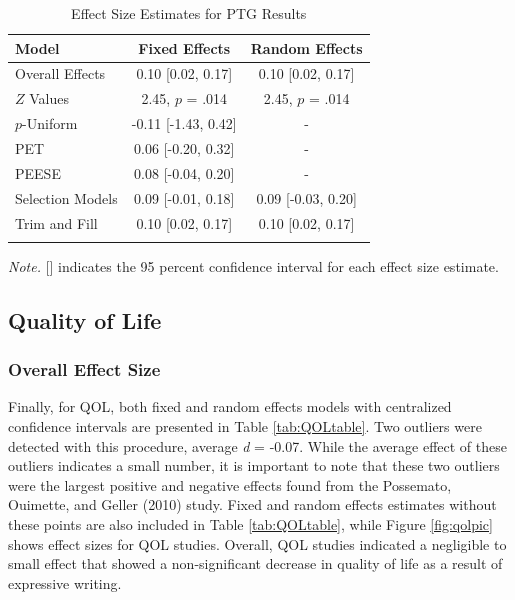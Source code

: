 \documentclass[,man]{apa6}
\begin{document}
\begin{table}[tbp]
\begin{center}
\begin{threeparttable}
\caption{\label{tab:PTGtable}Effect Size Estimates for PTG Results}
\small{
\begin{tabular}{lcc}
\toprule
Model & Fixed Effects & Random Effects\\
\midrule
Overall Effects & 0.10 [0.02, 0.17] & 0.10 [0.02, 0.17]\\
$Z$ Values & 2.45, $p$ = .014 & 2.45, $p$ = .014\\
$p$-Uniform & -0.11 [-1.43, 0.42] & -\\
PET & 0.06 [-0.20, 0.32] & -\\
PEESE & 0.08 [-0.04, 0.20] & -\\
Selection Models & 0.09 [-0.01, 0.18] & 0.09 [-0.03, 0.20]\\
Trim and Fill & 0.10 [0.02, 0.17] & 0.10 [0.02, 0.17]\\
\bottomrule
\addlinespace
\end{tabular}
}
\begin{tablenotes}[para]
\normalsize{\textit{Note.} [] indicates the 95 percent confidence interval for each effect size estimate.}
\end{tablenotes}
\end{threeparttable}
\end{center}
\end{table}

\hypertarget{quality-of-life-1}{%
\subsection{Quality of Life}\label{quality-of-life-1}}

\hypertarget{overall-effect-size-2}{%
\subsubsection{Overall Effect Size}\label{overall-effect-size-2}}

Finally, for QOL, both fixed and random effects models with centralized confidence intervals are presented in Table \ref{tab:QOLtable}. Two outliers were detected with this procedure, average \emph{d} = -0.07. While the average effect of these outliers indicates a small number, it is important to note that these two outliers were the largest positive and negative effects found from the Possemato, Ouimette, and Geller (2010) study. Fixed and random effects estimates without these points are also included in Table \ref{tab:QOLtable}, while Figure \ref{fig:qolpic} shows effect sizes for QOL studies. Overall, QOL studies indicated a negligible to small effect that showed a non-significant decrease in quality of life as a result of expressive writing.
\end{document}
